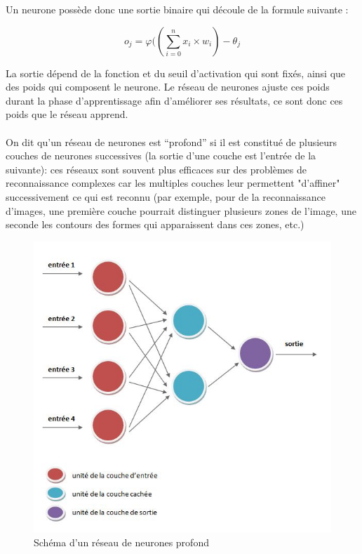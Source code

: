 \documentclass{article}
\begin{document}
\noindent Un neurone possède donc une sortie binaire qui découle de la formule suivante :

$$o_{j} = \varphi ((\sum_{i=0}^{n}x_{i} \times w_{i}) - \theta _{j}$$

\noindent La sortie dépend de la fonction et du seuil d'activation qui sont fixés, ainsi que des poids qui composent le neurone. Le réseau de neurones ajuste ces poids durant la phase d'apprentissage afin d'améliorer ses résultats, ce sont donc ces poids que le réseau apprend.\\
 \\
On dit qu'un réseau de neurones est ``profond'' si il est constitué de plusieurs couches de neurones successives (la sortie d'une couche est l'entrée de la suivante): ces réseaux sont souvent plus efficaces sur des problèmes de reconnaissance complexes car les multiples couches leur permettent "d'affiner" successivement ce qui est reconnu (par exemple, pour de la reconnaissance d'images, une première couche pourrait distinguer plusieurs zones de l'image, une seconde les contours des formes qui apparaissent dans ces zones, etc.)

\begin{figure}[h]
  \centerline{\includegraphics[scale=0.6]{img/organisation_en_couches_rdn.jpg}}
  \caption{Schéma d'un réseau de neurones profond}
\end{figure}
\end{document}
